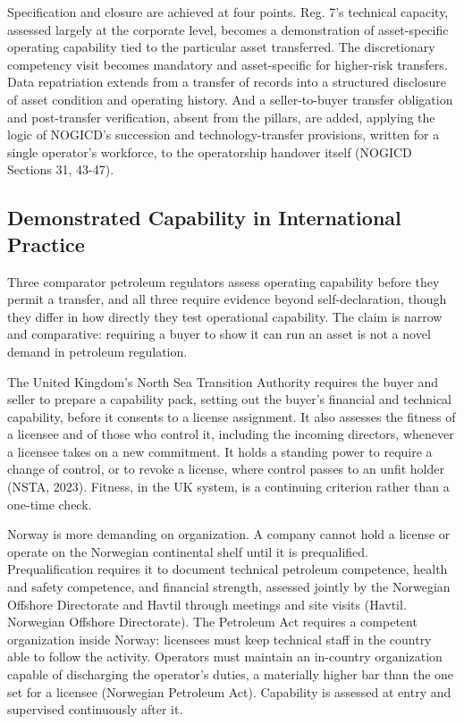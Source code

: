 \documentclass[twoside,fontset=lmodern]{mitthesis}
\begin{document}
Specification and closure are achieved at four points. Reg. 7's
technical capacity, assessed largely at the corporate level, becomes a
demonstration of asset-specific operating capability tied to the
particular asset transferred. The discretionary competency visit becomes
mandatory and asset-specific for higher-risk transfers. Data
repatriation extends from a transfer of records into a structured
disclosure of asset condition and operating history. And a
seller-to-buyer transfer obligation and post-transfer verification,
absent from the pillars, are added, applying the logic of NOGICD's
succession and technology-transfer provisions, written for a single
operator's workforce, to the operatorship handover itself (NOGICD
Sections 31, 43-47).

\hypertarget{demonstrated-capability-in-international-practice}{%
\subsection{Demonstrated Capability in International
Practice}\label{demonstrated-capability-in-international-practice}}

Three comparator petroleum regulators assess operating capability before
they permit a transfer, and all three require evidence beyond
self-declaration, though they differ in how directly they test
operational capability. The claim is narrow and comparative: requiring a
buyer to show it can run an asset is not a novel demand in petroleum
regulation.

The United Kingdom's North Sea Transition Authority requires the buyer
and seller to prepare a capability pack, setting out the buyer's
financial and technical capability, before it consents to a license
assignment. It also assesses the fitness of a licensee and of those who
control it, including the incoming directors, whenever a licensee takes
on a new commitment. It holds a standing power to require a change of
control, or to revoke a license, where control passes to an unfit holder
(NSTA, 2023). Fitness, in the UK system, is a continuing criterion
rather than a one-time check.

Norway is more demanding on organization. A company cannot hold a
license or operate on the Norwegian continental shelf until it is
prequalified. Prequalification requires it to document technical
petroleum competence, health and safety competence, and financial
strength, assessed jointly by the Norwegian Offshore Directorate and
Havtil through meetings and site visits (Havtil. Norwegian Offshore
Directorate). The Petroleum Act requires a competent organization inside
Norway: licensees must keep technical staff in the country able to
follow the activity. Operators must maintain an in-country organization
capable of discharging the operator's duties, a materially higher bar
than the one set for a licensee (Norwegian Petroleum Act). Capability is
assessed at entry and supervised continuously after it.
\end{document}
